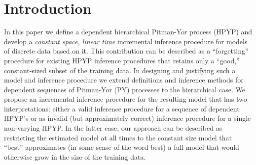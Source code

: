 \section{Introduction}
In this paper we define a dependent hierarchical Pitman-Yor process (HPYP) \cite{Teh2006a} and develop a {\em constant space, linear time} incremental inference procedure for models of discrete data based on it.   This contribution can be described as a ``forgetting'' procedure for existing HPYP inference procedures that retains only a ``good,'' constant-sized subset of the training data.  In designing and justifying such a model and inference procedure we extend definitions and inference methods for dependent sequences of Pitman-Yor (PY) processes \cite{Caron2007, Caron2007a} to the hierarchical case.    We propose an incremental inference procedure for the resulting model that has two interpretations: either a valid inference procedure for a sequence of dependent HPYP's or as invalid (but approximately correct) inference procedure for a single non-varying HPYP.   In the latter case, our approach can be described as restricting the estimated model at all times  to the constant size model that ``best'' approximates (in some sense of the word best) a full model that would otherwise grow in the size of the training data.   

